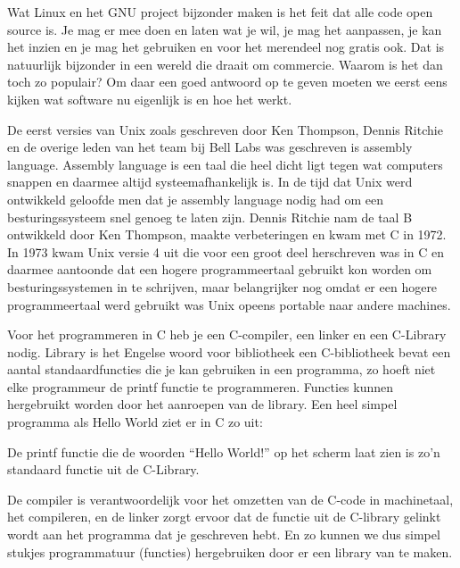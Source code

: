 Wat Linux en het GNU project bijzonder maken is het feit dat alle code open source is. Je mag er mee doen en laten wat
je wil, je mag het aanpassen, je kan het inzien en je mag het gebruiken en voor het merendeel nog gratis ook. Dat is
natuurlijk bijzonder in een wereld die draait om commercie. Waarom is het dan toch zo populair? Om daar een goed
antwoord op te geven moeten we eerst eens kijken wat software nu eigenlijk is en hoe het werkt.\par

De eerst versies van Unix zoals geschreven door Ken Thompson, Dennis Ritchie en de overige leden
van het team bij Bell Labs was geschreven is assembly language. Assembly language is een taal die heel dicht ligt tegen
wat computers snappen en daarmee altijd systeemafhankelijk is. In de tijd dat Unix werd ontwikkeld geloofde men dat je
assembly language nodig had om een besturingssysteem snel genoeg te laten zijn. Dennis Ritchie nam de taal B ontwikkeld
door Ken Thompson, maakte verbeteringen en kwam met C in
1972. In 1973 kwam Unix versie 4 uit die voor een groot deel herschreven was in C en daarmee aantoonde dat een hogere
programmeertaal gebruikt kon worden om besturingssystemen in te schrijven, maar belangrijker nog omdat er een hogere
programmeertaal werd gebruikt was Unix opeens portable naar andere machines.\par

Voor het programmeren in C heb je een C-compiler, een linker en een C-Library nodig. Library is het Engelse woord voor
bibliotheek een C-bibliotheek bevat een aantal standaardfuncties die je kan gebruiken in een programma, zo hoeft niet
elke programmeur de printf functie te programmeren. Functies kunnen hergebruikt worden door het aanroepen van de
library. Een heel simpel programma als Hello World ziet er in C zo uit:



De printf functie die de woorden ``Hello World!'' op het scherm laat zien is zo'n standaard functie uit de C-Library.\par

De compiler is verantwoordelijk voor het omzetten van de C-code in machinetaal, het compileren,
en de linker zorgt ervoor dat de functie uit de C-library gelinkt wordt aan het programma dat je geschreven hebt. En zo
kunnen we dus simpel stukjes programmatuur (functies) hergebruiken door er een library van te maken.\par

